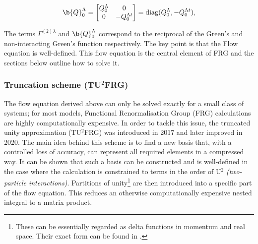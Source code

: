 \documentclass[11pt]{article}
\begin{document}
\begin{equation}\label{Q0 term }
\b{Q}_0^{\Lambda} =
\begin{bmatrix}
Q_0^{\Lambda} & 0 \\
0 & -Q_0^{\Lambda t}
\end{bmatrix}
= \mathrm{diag}(Q_0^{\Lambda}, - Q_0^{\Lambda t}),
\end{equation}

\noindent The terms $\Gamma^{(2)\lambda}$ and $\b{Q}_0^{\Lambda}$ correspond to the reciprocal 
of the Green's and non-interacting Green's function respectively.
The key point is that the Flow equation is well-defined. 
This flow equation is the central element of FRG and the sections below outline how to solve it.


\subsubsection{Truncation scheme (TU$^2$FRG)}
\label{subsubsec:Truncation scheme}


The flow equation derived above can only be solved exactly for a small class of systems; for most models, Functional Renormalisation Group (FRG) 
calculations are highly computationally expensive.
In order to tackle this issue, the truncated unity approximation (TU$^2$FRG) was introduced in 2017\cite{lichtenstein2017high} and later improved in 2020\cite{eckhardt2020truncated}. 
The main idea behind this scheme is to find a new basis that, with a controlled loss of accuracy, can represent all 
required elements in a compressed way. It can be shown that such a basis can be constructed and is 
well-defined in the case where the calculation is constrained to terms in the order of U$^{2}$ \textit{(two-particle interactions)}\cite{lichtenstein2018functional}.
Partitions of unity\footnote{These can be essentially regarded as delta functions in momentum and real space. Their exact form can be found in \cite{lichtenstein2018functional}.} are then introduced into a specific part of the flow equation. This reduces an otherwise computationally expensive nested integral to a matrix product.\par
\medskip
\end{document}
